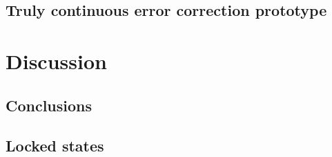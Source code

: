 \documentclass{report}
\begin{document}
\section{Truly continuous error correction prototype}

\chapter {Discussion}

\section{Conclusions}

\printbibliography %

\begin{appendices}
\chapter{Locked states}
\end{appendices}
\end{document}
